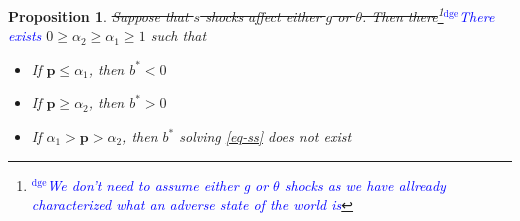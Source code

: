 \documentclass[12pt]{article}
\newcommand{\dge}[1]{\textcolor{blue}{$^{\textrm{dge}}${#1}}}
\newtheorem{proposition}[theorem]{Proposition}
\begin{document}
\begin{proposition}\label{prop:ssexistence}
\st{Suppose that $s$ shocks affect either $g$ or $\theta$.  Then there}\footnote{\dge{We don't need to assume either g or $\theta$ shocks as we have allready characterized what an adverse state of the world is}}\dge{There exists} $0 \geq \alpha_2\geq\alpha_1\geq1$
such that
  \begin{itemize}
   \item[a.] If $\bm{p}\leq \alpha_1$, then $b^* < 0$ %
   \item[b.] If $\bm{p} \geq \alpha_2$, then $b^* > 0$ %
   \item[c.] If $\alpha_1>\bm{p}>\alpha_2$, then $b^*$ solving \eqref{eq-ss}  does not exist
  \end{itemize}

\end{proposition}
\end{document}
